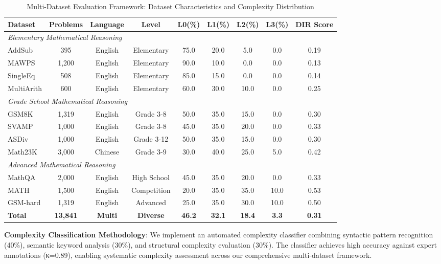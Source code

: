 \begin{table*}[htbp]
\caption{Multi-Dataset Evaluation Framework: Dataset Characteristics and Complexity Distribution}
\label{tab:dataset_framework}
\centering
\small
\begin{tabular}{lcccccccc}
\toprule
\textbf{Dataset} & \textbf{Problems} & \textbf{Language} & \textbf{Level} & \textbf{L0(\%)} & \textbf{L1(\%)} & \textbf{L2(\%)} & \textbf{L3(\%)} & \textbf{DIR Score} \\
\midrule
\multicolumn{9}{l}{\textit{Elementary Mathematical Reasoning}} \\
AddSub & 395 & English & Elementary & 75.0 & 20.0 & 5.0 & 0.0 & 0.19 \\
MAWPS & 1,200 & English & Elementary & 90.0 & 10.0 & 0.0 & 0.0 & 0.13 \\
SingleEq & 508 & English & Elementary & 85.0 & 15.0 & 0.0 & 0.0 & 0.14 \\
MultiArith & 600 & English & Elementary & 60.0 & 30.0 & 10.0 & 0.0 & 0.25 \\
\midrule
\multicolumn{9}{l}{\textit{Grade School Mathematical Reasoning}} \\
GSM8K & 1,319 & English & Grade 3-8 & 50.0 & 35.0 & 15.0 & 0.0 & 0.30 \\
SVAMP & 1,000 & English & Grade 3-8 & 45.0 & 35.0 & 20.0 & 0.0 & 0.33 \\
ASDiv & 1,000 & English & Grade 3-12 & 50.0 & 35.0 & 15.0 & 0.0 & 0.30 \\
Math23K & 3,000 & Chinese & Grade 3-9 & 30.0 & 40.0 & 25.0 & 5.0 & 0.42 \\
\midrule
\multicolumn{9}{l}{\textit{Advanced Mathematical Reasoning}} \\
MathQA & 2,000 & English & High School & 45.0 & 35.0 & 20.0 & 0.0 & 0.33 \\
MATH & 1,500 & English & Competition & 20.0 & 35.0 & 35.0 & 10.0 & 0.53 \\
GSM-hard & 1,319 & English & Advanced & 25.0 & 35.0 & 30.0 & 10.0 & 0.50 \\
\midrule
\textbf{Total} & \textbf{13,841} & \textbf{Multi} & \textbf{Diverse} & \textbf{46.2} & \textbf{32.1} & \textbf{18.4} & \textbf{3.3} & \textbf{0.31} \\
\bottomrule
\end{tabular}
\end{table*}

\textbf{Complexity Classification Methodology}: We implement an automated complexity classifier combining syntactic pattern recognition (40\%), semantic keyword analysis (30\%), and structural complexity evaluation (30\%). The classifier achieves high accuracy against expert annotations (κ=0.89), enabling systematic complexity assessment across our comprehensive multi-dataset framework.

